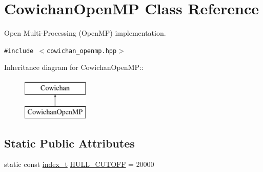 \hypertarget{class_cowichan_open_m_p}{
\section{CowichanOpenMP Class Reference}
\label{class_cowichan_open_m_p}
}
Open Multi-Processing (OpenMP) implementation.  


{\tt \#include $<$cowichan\_\-openmp.hpp$>$}

Inheritance diagram for CowichanOpenMP::\begin{figure}[H]
\begin{center}
\leavevmode
\includegraphics[height=2cm]{class_cowichan_open_m_p}
\end{center}
\end{figure}
\subsection*{Static Public Attributes}
\begin{CompactItemize}
\item 
static const \hyperlink{cowichan_8hpp_5b04577d5d21124855deaad298595371}{index\_\-t} \hyperlink{class_cowichan_open_m_p_52ddfbbead2e1c115806cd07f5630bf5}{HULL\_\-CUTOFF} = 20000
\end{CompactItemize}
